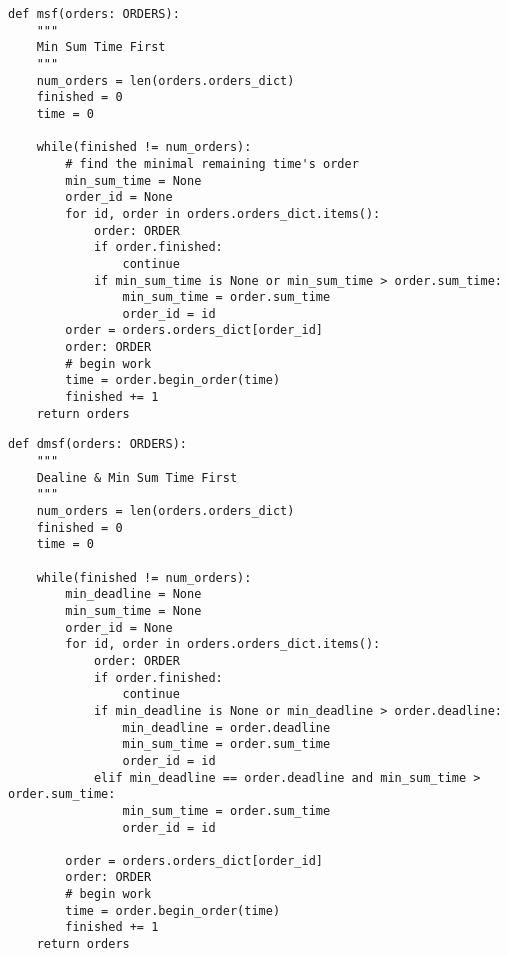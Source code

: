\begin{lstlisting}[caption={msf}, label={lst:python}]
def msf(orders: ORDERS):
    """
    Min Sum Time First
    """
    num_orders = len(orders.orders_dict)
    finished = 0
    time = 0
    
    while(finished != num_orders):
        # find the minimal remaining time's order
        min_sum_time = None
        order_id = None
        for id, order in orders.orders_dict.items():
            order: ORDER
            if order.finished:
                continue
            if min_sum_time is None or min_sum_time > order.sum_time:
                min_sum_time = order.sum_time
                order_id = id
        order = orders.orders_dict[order_id]
        order: ORDER
        # begin work
        time = order.begin_order(time)
        finished += 1
    return orders
\end{lstlisting}

\begin{lstlisting}[caption={dmsf}, label={lst:python}]
def dmsf(orders: ORDERS):
    """
    Dealine & Min Sum Time First
    """
    num_orders = len(orders.orders_dict)
    finished = 0
    time = 0
    
    while(finished != num_orders):
        min_deadline = None
        min_sum_time = None
        order_id = None
        for id, order in orders.orders_dict.items():
            order: ORDER
            if order.finished:
                continue
            if min_deadline is None or min_deadline > order.deadline:
                min_deadline = order.deadline
                min_sum_time = order.sum_time
                order_id = id
            elif min_deadline == order.deadline and min_sum_time > order.sum_time:
                min_sum_time = order.sum_time
                order_id = id
                    
        order = orders.orders_dict[order_id]
        order: ORDER
        # begin work
        time = order.begin_order(time)
        finished += 1
    return orders
\end{lstlisting}

